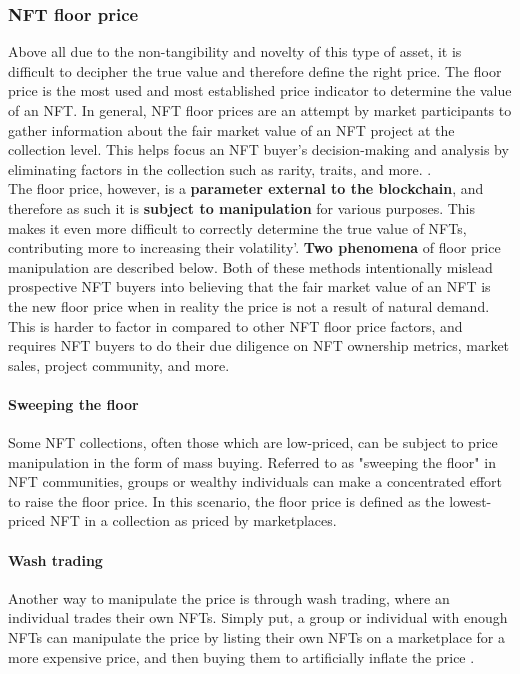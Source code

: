 \subsubsection{NFT floor price}
Above all due to the non-tangibility and novelty of this type of asset, it is difficult to decipher the true value and therefore define the right price. The floor price is the most used and most established price indicator to determine the value of an NFT. In general, NFT floor prices are an attempt by market participants to gather information about the fair market value of an NFT project at the collection level. This helps focus an NFT buyer's decision-making and analysis by eliminating factors in the collection such as rarity, traits, and more. \cite{FloorPrice}.
\\
\indent The floor price, however, is a \textbf{parameter external to the blockchain}, and therefore as such it is \textbf{subject to manipulation} for various purposes. This makes it even more difficult to correctly determine the true value of NFTs, contributing more to increasing their volatility'. \textbf{Two phenomena} of floor price manipulation are described below. Both of these methods intentionally mislead prospective NFT buyers into believing that the fair market value of an NFT is the new floor price when in reality the price is not a result of natural demand. This is harder to factor in compared to other NFT floor price factors, and requires NFT buyers to do their due diligence on NFT ownership metrics, market sales, project community, and more. 
\paragraph{Sweeping the floor}
Some NFT collections, often those which are low-priced, can be subject to price manipulation in the form of mass buying. Referred to as "sweeping the floor" in NFT communities, groups or wealthy individuals can make a concentrated effort to raise the floor price. In this scenario, the floor price is defined as the lowest-priced NFT in a collection as priced by marketplaces. 
\paragraph{Wash trading}
Another way to manipulate the price is through wash trading, where an individual trades their own NFTs. Simply put, a group or individual with enough NFTs can manipulate the price by listing their own NFTs on a marketplace for a more expensive price, and then buying them to artificially inflate the price \cite{la2022nft}.

